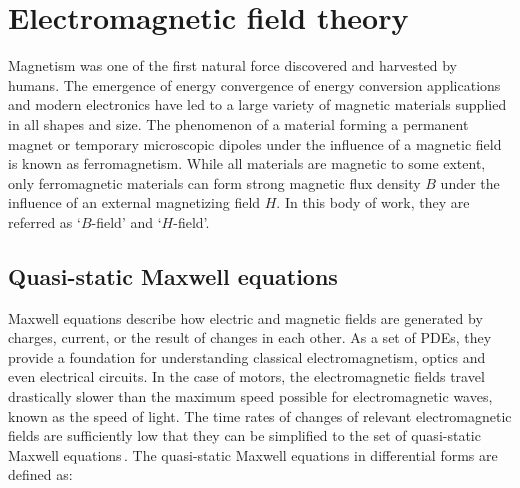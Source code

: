 \section{Electromagnetic field theory}              \label{Chapter:background/electromagnetic field theory}


    Magnetism was one of the first natural force discovered and harvested by humans. The emergence of energy convergence of energy conversion applications and modern electronics have led to a large variety of magnetic materials supplied in all shapes and size. The phenomenon of a material forming a permanent magnet or temporary microscopic dipoles under the influence of a magnetic field is known as ferromagnetism. While all materials are magnetic to some extent, only ferromagnetic materials can form strong magnetic flux density $B$ under the influence of an external magnetizing field $H$. In this body of work, they are referred as ‘$B$-field’ and ‘$H$-field’. 
    

    \subsection{Quasi-static Maxwell equations}     \label{Chapter:background/electromagnetic field theory/quasi-static maxwell equations}
    
    
        Maxwell equations describe how electric and magnetic fields are generated by charges, current, or the result of changes in each other. As a set of \acp{PDE}, they provide a foundation for understanding classical electromagnetism, optics and even electrical circuits. In the case of motors, the electromagnetic fields travel drastically slower than the maximum speed possible for electromagnetic waves, known as the speed of light. The time rates of changes of relevant electromagnetic fields are sufficiently low that they can be simplified to the set of quasi-static Maxwell equations\,\cite{Melcher1981ContinuumElectromechanics}. The quasi-static Maxwell equations in differential forms are defined as:
    
